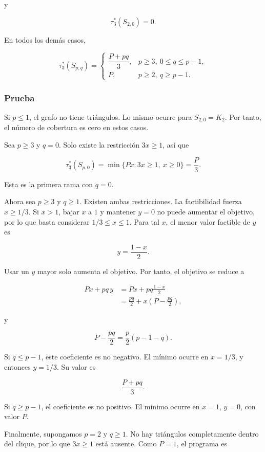 \documentclass[
  11pt,
]{article}
\begin{document}
y

\[
\tau_3^*(S_{2,0})=0.
\]

En todos los demás casos,

\[
\boxed{
\tau_3^*(S_{p,q})
=
\begin{cases}
\dfrac{P+pq}{3},
& p\ge3,\ 0\le q\le p-1,\\[3mm]
P,
& p\ge2,\ q\ge p-1.
\end{cases}
}
\]

\subsubsection{Prueba}\label{prueba-9}

Si \(p\le1\), el grafo no tiene triángulos. Lo mismo ocurre para
\(S_{2,0}=K_2\). Por tanto, el número de cobertura es cero en estos
casos.

Sea \(p\ge3\) y \(q=0\). Solo existe la restricción \(3x\ge1\), así que

\[
\tau_3^*(S_{p,0})
=
\min\{Px:3x\ge1,\ x\ge0\}
=
\frac P3.
\]

Esta es la primera rama con \(q=0\).

Ahora sea \(p\ge3\) y \(q\ge1\). Existen ambas restricciones. La
factibilidad fuerza \(x\ge1/3\). Si \(x>1\), bajar \(x\) a \(1\) y
mantener \(y=0\) no puede aumentar el objetivo, por lo que basta
considerar \(1/3\le x\le1\). Para tal \(x\), el menor valor factible de
\(y\) es

\[
y=\frac{1-x}{2}.
\]

Usar un \(y\) mayor solo aumenta el objetivo. Por tanto, el objetivo se
reduce a

\[
\begin{aligned}
Px+pq\,y
&=
Px+pq\frac{1-x}{2}\\
&=
\frac{pq}{2}
+
x\left(P-\frac{pq}{2}\right),
\end{aligned}
\]

y

\[
P-\frac{pq}{2}
=
\frac p2(p-1-q).
\]

Si \(q\le p-1\), este coeficiente es no negativo. El mínimo ocurre en
\(x=1/3\), y entonces \(y=1/3\). Su valor es

\[
\frac{P+pq}{3}.
\]

Si \(q\ge p-1\), el coeficiente es no positivo. El mínimo ocurre en
\(x=1\), \(y=0\), con valor \(P\).

Finalmente, supongamos \(p=2\) y \(q\ge1\). No hay triángulos
completamente dentro del clique, por lo que \(3x\ge1\) está ausente.
Como \(P=1\), el programa es
\end{document}
